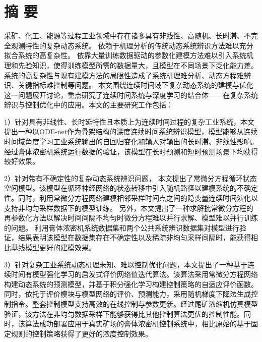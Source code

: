 
\chapter*{ 摘 \space 要 }

采矿、化工、能源等过程工业领域中存在诸多具有非线性、高随机、长时滞、不完全观测特性的复杂动态系统。
依赖于机理分析的传统动态系统辨识方法难以充分拟合系统的高复杂性。
依靠大量训练数据驱动的参数化建模方法难以引入系统机理和先验知识，使得训练模型所需的数据量大，且模型在不同场景下泛化能力差。
系统的高复杂性与现有建模方法的局限性造成了系统机理难分析、动态方程难辨识、关键指标难控制等问题。
本文围绕连续时间域下复杂动态系统的建模与优化这一问题展开讨论，重点研究了连续时间系统与深度学习的结合体——在复杂系统辨识与控制优化中的应用。本文的主要研究工作包括：

1）针对具有非线性、长时延特性且本质上为连续时间过程的复杂工业系统，本文提出一种以ODE-net作为骨架结构的深度连续时间系统辨识模型，模型能够从连续时间域角度学习工业系统输出的自回归变化和输入对输出的长时滞、非线性影响。经过膏体浓密机系统运行数据的验证，该模型在长时预测和短时预测场景下均获得较好效果。   

2）针对带有不确定性的复杂动态系统辨识问题，
本文提出了常微分方程循环状态空间模型。该模型在循环神经网络的状态转移中引入随机路径以建模系统的不确定性。同时，利用常微分方程网络建模相邻采样时间点之间的隐变量连续时间演化以支持非均匀采样数据下的模型训练。
另外，本文提出了一种求解批常微分方程的再参数化方法以解决时间间隔不均匀时微分方程难以并行求解、模型难以并行训练的问题。
利用膏体浓密机系统数据集和两个公共系统辨识数据集对模型进行验证，结果表明该模型在数据集存在不确定性以及稀疏非均匀采样间隔时，能获得相比基线模型更好的建模效果。

3）针对复杂工业系统动态机理未知、难以控制优化问题，本文提出了一种基于连续时间有模型强化学习的启发式评价网络值迭代算法。该算法采用常微分方程网络构建动态系统的预测模型，并基于积分强化学习构建控制策略的自适应评价函数。
同时，依托于评价模块与模型网络的评价、预测能力，采用随机梯度下降法生成控制指令。整套控制模型支持高效的在线控制与参数更新。经过尾矿浓缩机仿真模型验证，该方法在非均匀数据采样下能够获得比其他控制算法更优的控制性能。同时，该算法成功部署应用于真实矿场的膏体浓密机控制系统中，相比原始的基于固定规则的控制策略获得了更好的浓度控制效果。

